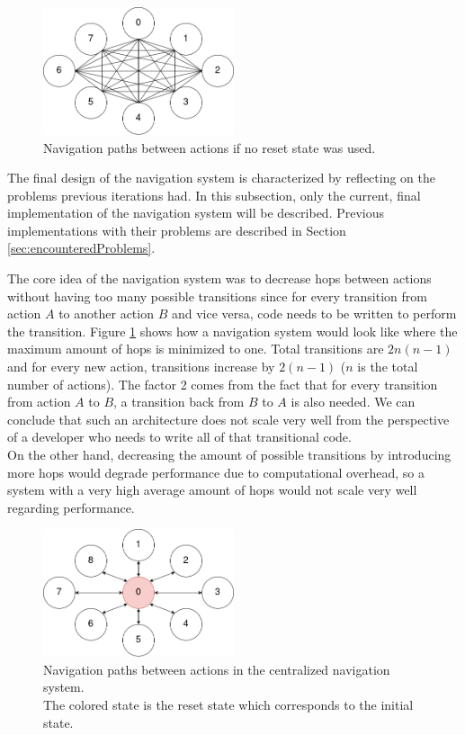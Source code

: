 \begin{figure}
\centering
\includegraphics[width=0.5\textwidth]{figures/navigationsystem-diagram/navigationsystem-all-overview.png}
\caption[Navigation paths (no reset state)]{Navigation paths between actions if no reset state was used.}
\label{fig:navsystem.all.overview}
\end{figure}

The final design of the navigation system is characterized by reflecting on the problems previous iterations had. In this subsection, only the current, final implementation of the navigation system will be described. Previous implementations with their problems are described in Section \ref{sec:encounteredProblems}.

The core idea of the navigation system was to decrease hops between actions without having too many possible transitions since for every transition from action $A$ to another action $B$ and vice versa, code needs to be written to perform the transition. Figure \ref{fig:navsystem.all.overview} shows how a navigation system would look like where the maximum amount of hops is minimized to one. Total transitions are $2n(n-1)$ and for every new action, transitions increase by $2(n-1)$ ($n$ is the total number of actions). The factor 2 comes from the fact that for every transition from action $A$ to $B$, a transition back from $B$ to $A$ is also needed. We can conclude that such an architecture does not scale very well from the perspective of a developer who needs to write all of that transitional code. \\
On the other hand, decreasing the amount of possible transitions by introducing more hops would degrade performance due to computational overhead, so a system with a very high average amount of hops would not scale very well regarding performance.

\begin{figure}
\centering
\includegraphics[width=0.5\textwidth]{figures/navigationsystem-diagram/navigationsystem-central-overview.png}
\caption[Navigation paths in centralized navigation system]{Navigation paths between actions in the centralized navigation system. \\The colored state is the reset state which corresponds to the initial state.}
\label{fig:navsystem.central.overview}
\end{figure}

